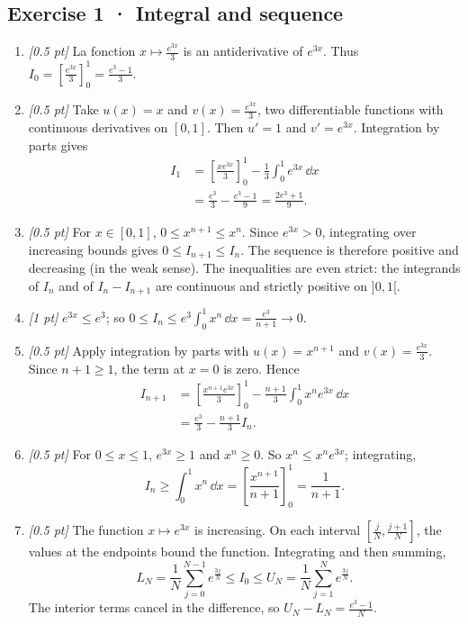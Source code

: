\subsection*{Exercise 1 · Integral and sequence}\begin{enumerate}

\item \textit{[0.5 pt]} La fonction $x\mapsto \frac{e^{3x}}{3}$ is an antiderivative of $e^{3x}$. Thus $I_0=[\frac{e^{3x}}{3}]_0^1=\frac{e^{3}-1}{3}$.

\item \textit{[0.5 pt]} Take $u(x)=x$ and $v(x)=\frac{e^{3x}}{3}$, two differentiable functions with continuous derivatives on $[0,1]$. Then $u'=1$ and $v'=e^{3x}$. Integration by parts gives
\[\begin{aligned}I_1&=\left[\frac{xe^{3x}}{3}\right]_0^1-\frac{1}{3}\int_0^1e^{3x}\,\dd x\\&=\frac{e^{3}}{3}-\frac{e^{3}-1}{9}=\frac{2e^{3}+1}{9}.\end{aligned}\]

\item \textit{[0.5 pt]} For $x\in[0,1]$, $0\le x^{n+1}\le x^n$. Since $e^{3x}>0$, integrating over increasing bounds gives $0\le I_{n+1}\le I_n$. The sequence is therefore positive and decreasing (in the weak sense). The inequalities are even strict: the integrands of $I_n$ and of $I_n-I_{n+1}$ are continuous and strictly positive on $]0,1[$.

\item \textit{[1 pt]} $e^{3x}\le e^{3}$; so $0\le I_n\le e^{3}\int_0^1x^n\,\dd x=\frac{e^{3}}{n+1}\to0$.

\item \textit{[0.5 pt]} Apply integration by parts with $u(x)=x^{n+1}$ and $v(x)=\frac{e^{3x}}{3}$. Since $n+1\ge1$, the term at $x=0$ is zero. Hence
\[\begin{aligned}I_{n+1}&=\left[\frac{x^{n+1}e^{3x}}{3}\right]_0^1-\frac{n+1}{3}\int_0^1x^ne^{3x}\,\dd x\\&=\frac{e^{3}}{3}-\frac{n+1}{3}I_n.\end{aligned}\]

\item \textit{[0.5 pt]} For $0\le x\le1$, $e^{3x}\ge1$ and $x^n\ge0$. So $x^n\le x^ne^{3x}$; integrating,
\[I_n\ge\int_0^1x^n\,\dd x=\left[\frac{x^{n+1}}{n+1}\right]_0^1=\frac{1}{n+1}.\]

\item \textit{[0.5 pt]} The function $x\mapsto e^{3x}$ is increasing. On each interval $[\frac{j}{N},\frac{j+1}{N}]$, the values at the endpoints bound the function. Integrating and then summing,
\[L_N=\frac{1}{N}\sum_{j=0}^{N-1}e^{\frac{3j}{N}}\le I_0\le U_N=\frac{1}{N}\sum_{j=1}^Ne^{\frac{3j}{N}}.\]
The interior terms cancel in the difference, so $U_N-L_N=\frac{e^{3}-1}{N}$.


\end{enumerate}
